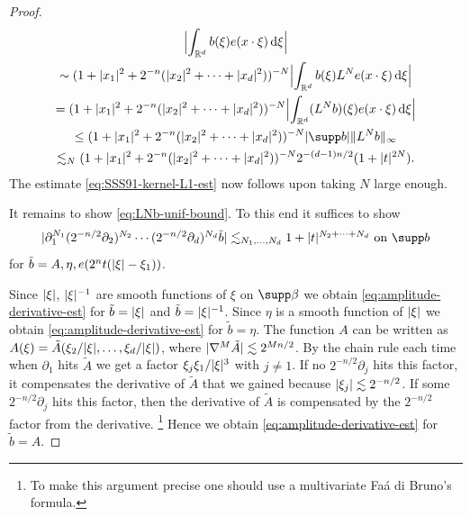 \begin{proof}
\begin{multline*}
\abs[\Big]{ \int_{\R^{d}} b(\xi) e(x \cdot \xi) \dif\xi }\\
\sim
(1+\abs{x_{1}}^{2}+2^{-n} (\abs{x_{2}}^{2} + \dotsb + \abs{x_{d}}^{2}))^{-N} \abs[\Big]{ \int_{\R^{d}} b(\xi) L^{N} e(x \cdot \xi) \dif \xi }\\
=
(1+\abs{x_{1}}^{2}+2^{-n} (\abs{x_{2}}^{2} + \dotsb + \abs{x_{d}}^{2}))^{-N} \abs[\Big]{ \int_{\R^{d}} (L^{N}b)(\xi) e(x \cdot \xi) \dif \xi }\\
\leq
(1+\abs{x_{1}}^{2}+2^{-n} (\abs{x_{2}}^{2} + \dotsb + \abs{x_{d}}^{2}))^{-N} \abs{ \supp b } \norm{L^{N} b}_{\infty}\\
\lesssim_{N}
(1+\abs{x_{1}}^{2}+2^{-n} (\abs{x_{2}}^{2} + \dotsb + \abs{x_{d}}^{2}))^{-N} 2^{-(d-1)n/2} (1+\abs{t}^{2N}).
\end{multline*}
The estimate \eqref{eq:SSS91-kernel-L1-est} now follows upon taking $N$ large enough.

It remains to show \eqref{eq:LNb-unif-bound}.
To this end it suffices to show
\begin{equation}
\label{eq:amplitude-derivative-est}
\abs{\partial_{1}^{N_{1}} (2^{-n/2}\partial_{2})^{N_{2}} \dotsm (2^{-n/2}\partial_{d})^{N_{d}} \tilde{b} } \lesssim_{N_{1},\dotsc,N_{d}} 1 + \abs{t}^{N_{2} + \dotsb + N_{d}}
\text{ on } \supp b
\end{equation}
for $\tilde{b} = A,\eta,e(2^{n}t(\lvert\xi\rvert-\xi_{1}))$.

Since $\lvert\xi\rvert$, $\lvert\xi\rvert^{-1}$ are smooth functions of $\xi$ on $\supp\beta$ we obtain \eqref{eq:amplitude-derivative-est} for $\tilde{b}=\lvert\xi\rvert$ and $\tilde{b}=\lvert\xi\rvert^{-1}$.
Since $\eta$ is a smooth function of $\lvert\xi\rvert$ we obtain \eqref{eq:amplitude-derivative-est} for $\tilde{b}=\eta$.
The function $A$ can be written as $A(\xi) = \tilde{A}(\xi_{2}/\lvert\xi\rvert,\dotsc,\xi_{d}/\lvert\xi\rvert)$, where $\lvert\nabla^{M}\tilde{A}\rvert \lesssim 2^{Mn/2}$.
By the chain rule each time when $\partial_{1}$ hits $\tilde{A}$ we get a factor $\xi_{j}\xi_{1}/\lvert\xi\rvert^{3}$ with $j\neq 1$.
If no $2^{-n/2}\partial_{j}$ hits this factor, it compensates the derivative of $\tilde{A}$ that we gained because $\lvert\xi_{j}\rvert \lesssim 2^{-n/2}$.
If some $2^{-n/2}\partial_{j}$ hits this factor, then the derivative of $\tilde{A}$ is compensated by the $2^{-n/2}$ factor from the derivative.%
\footnote{To make this argument precise one should use a multivariate Fa\'a di Bruno's formula.}
Hence we obtain \eqref{eq:amplitude-derivative-est} for $\tilde{b}=A$.


\end{proof}
